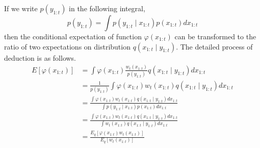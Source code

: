 \documentclass[mstat,12pt]{unswthesis}  %
\numberwithin{equation}{section}
\begin{document}
\noindent If we write $p\left(y_{1:t}\right)$ in the following integral,
\begin{equation}
    p\left(y_{1:t}\right)=
    \int p\left(y_{1:t} \mid x_{1:t}\right)p\left(x_{1:t}\right) d x_{1:t}
\end{equation}
then  the conditional expectation of function $\varphi(x_{1:t})$ can be transformed to the ratio of 
two expectations on distribution $q\left(x_{1:t} \mid y_{1:t}\right)$.
The detailed process of deduction is as follows.
\begin{equation}\begin{aligned}
E\left[\varphi\left(x_{1:t}\right)\right]
&=\int \varphi\left(x_{1:t}\right)\frac{w_{t}\left(x_{1:t}\right) }{p\left(y_{1:t} \right)} q\left(x_{1:t} \mid y_{1:t}\right) d x_{1:t}\\
&=\frac{1}{p\left(y_{1:t} \right)}\int \varphi\left(x_{1:t}\right)w_{t}\left(x_{1:t}\right) q\left(x_{1:t} \mid y_{1:t}\right) d x_{1:t}\\
&=\frac{\int \varphi\left(x_{1:t}\right)w_{t}\left(x_{1:t}\right) q\left(x_{1:t} \mid y_{1:t}\right) d x_{1:t}}{\int p\left(y_{1:t} \mid x_{1:t}\right)p\left(x_{1:t}\right) d x_{1:t}}\\
&=\frac{\int \varphi\left(x_{1:t}\right)w_{t}\left(x_{1:t}\right) q\left(x_{1:t} \mid y_{1:t}\right) d x_{1:t}}{\int w_{t}\left(x_{1:t}\right)q\left(x_{1:t} \mid y_{1:t}\right)d x_{1:t}}\\
&=\frac{E_{q}\left[ \varphi\left(x_{1:t}\right)w_{t}\left(x_{1:t}\right)\right]}
{E_{q}\left[ w_{t}\left(x_{1:t}\right)\right]}
\end{aligned}\end{equation}\\
\end{document}
